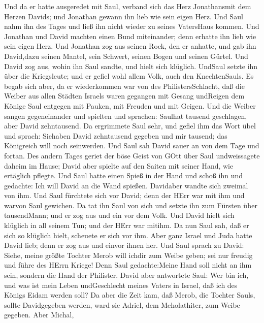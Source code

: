  Und da er hatte ausgeredet mit Saul, verband sich das Herz
Jonathansmit dem Herzen Davids; und Jonathan gewann ihn lieb wie sein
eigen Herz.  Und Saul nahm ihn des Tages und ließ ihn nicht
wieder zu seines VatersHaus kommen.  Und Jonathan und David
machten einen Bund miteinander; denn erhatte ihn lieb wie sein eigen
Herz.  Und Jonathan zog aus seinen Rock, den er anhatte, und
gab ihn David,dazu seinen Mantel, sein Schwert, seinen Bogen und seinen
Gürtel.  Und David zog aus, wohin ihn Saul sandte, und hielt
sich klüglich. UndSaul setzte ihn über die Kriegsleute; und er gefiel
wohl allem Volk, auch den KnechtenSauls.  Es begab sich
aber, da er wiederkommen war von des PhilistersSchlacht, daß die Weiber
aus allen Städten Israels waren gegangen mit Gesang undReigen dem Könige
Saul entgegen mit Pauken, mit Freuden und mit Geigen.  Und
die Weiber sangen gegeneinander und spielten und sprachen: Saulhat
tausend geschlagen, aber David zehntausend.  Da ergrimmete
Saul sehr, und gefiel ihm das Wort übel und sprach: Siehaben David
zehntausend gegeben und mir tausend; das Königreich will noch
seinwerden.  Und Saul sah David sauer an von dem Tage und
fortan.  Des andern Tages geriet der böse Geist von GOtt
über Saul undweissagete daheim im Hause; David aber spielte auf den
Saiten mit seiner Hand, wie ertäglich pflegte. Und Saul hatte einen
Spieß in der Hand  und schoß ihn und gedachte: Ich will
David an die Wand spießen. Davidaber wandte sich zweimal von ihm.
 Und Saul fürchtete sich vor David; denn der HErr war mit
ihm und warvon Saul gewichen.  Da tat ihn Saul von sich und
setzte ihn zum Fürsten über tausendMann; und er zog aus und ein vor dem
Volk.  Und David hielt sich klüglich in all seinem Tun; und
der HErr war mitihm.  Da nun Saul sah, daß er sich so
klüglich hielt, scheuete er sich vor ihm.  Aber ganz Israel
und Juda hatte David lieb; denn er zog aus und einvor ihnen her.
 Und Saul sprach zu David: Siehe, meine größte Tochter
Merob will ichdir zum Weibe geben; sei nur freudig und führe des HErrn
Kriege! Denn Saul gedachte:Meine Hand soll nicht an ihm sein, sondern
die Hand der Philister.  David aber antwortete Saul: Wer
bin ich, und was ist mein Leben undGeschlecht meines Vaters in Israel,
daß ich des Königs Eidam werden soll?  Da aber die Zeit
kam, daß Merob, die Tochter Sauls, sollte Davidgegeben werden, ward sie
Adriel, dem Meholathiter, zum Weibe gegeben.  Aber Michal,
